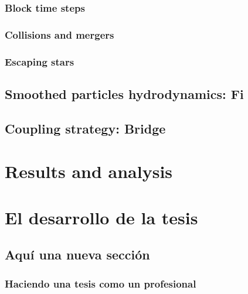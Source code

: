 \subsection{Block time steps}
\subsection{Collisions and mergers}
\subsection{Escaping stars}

\section{Smoothed particles hydrodynamics: Fi}
\section{Coupling strategy: Bridge}

\chapter{Results and analysis}

\chapter{El desarrollo de la tesis}

\section{Aquí una nueva sección}

\subsection{Haciendo una tesis como un profesional}


	~ \lipsum[6] \newp

